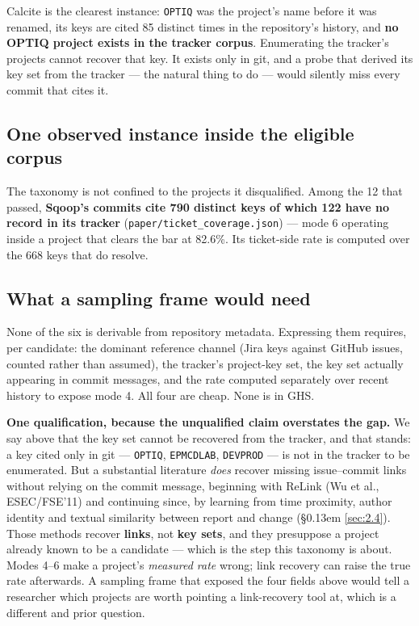 \documentclass[11pt,a4paper]{article}
\begin{document}
Calcite is the clearest instance: \texttt{OPTIQ} was the project's name before it was renamed, its keys are cited 85 distinct times in the repository's history, and \textbf{no OPTIQ project exists in the tracker corpus}. Enumerating the tracker's projects cannot recover that key. It exists only in git, and a probe that derived its key set from the tracker --- the natural thing to do --- would silently miss every commit that cites it.

\subsection{One observed instance inside the eligible corpus}
\label{sec:5.4}

The taxonomy is not confined to the projects it disqualified. Among the 12 that passed, \textbf{Sqoop's commits cite 790 distinct keys of which 122 have no record in its tracker} (\texttt{paper/\allowbreak{}ticket\_\allowbreak{}coverage.\allowbreak{}json}) --- mode 6 operating inside a project that clears the bar at 82.6\%. Its ticket-side rate is computed over the 668 keys that do resolve.

\subsection{What a sampling frame would need}
\label{sec:5.5}

None of the six is derivable from repository metadata. Expressing them requires, per candidate: the dominant reference channel (Jira keys against GitHub issues, counted rather than assumed), the tracker's project-key set, the key set actually appearing in commit messages, and the rate computed separately over recent history to expose mode 4. All four are cheap. None is in GHS.

\textbf{One qualification, because the unqualified claim overstates the gap.} We say above that the key set cannot be recovered from the tracker, and that stands: a key cited only in git --- \texttt{OPTIQ}, \texttt{EPMCDLAB}, \texttt{DEVPROD} --- is not in the tracker to be enumerated. But a substantial literature \emph{does} recover missing issue--commit links without relying on the commit message, beginning with ReLink \cite{wu2011relink} (Wu et al., ESEC/FSE'11) and continuing since, by learning from time proximity, author identity and textual similarity between report and change (\S\kern0.13em \ref{sec:2.4}). Those methods recover \textbf{links}, not \textbf{key sets}, and they presuppose a project already known to be a candidate --- which is the step this taxonomy is about. Modes 4--6 make a project's \emph{measured rate} wrong; link recovery can raise the true rate afterwards. A sampling frame that exposed the four fields above would tell a researcher which projects are worth pointing a link-recovery tool at, which is a different and prior question.
\end{document}
